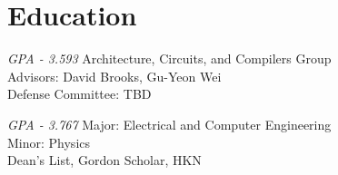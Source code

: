 \section{Education}
{\textit{GPA - 3.593}}
{ Architecture, Circuits, and Compilers Group \\
  Advisors: David Brooks, Gu-Yeon Wei \\
  Defense Committee: TBD}

{\textit{GPA - 3.767}}
{ Major: Electrical and Computer Engineering \\
  Minor: Physics \\
  Dean's List, Gordon Scholar, HKN}
